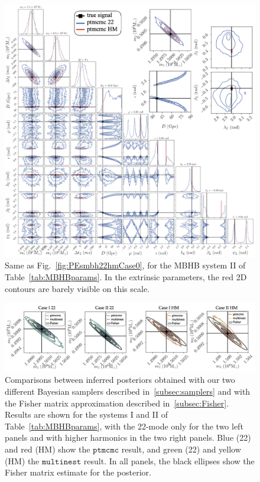 \documentclass[aps,showpacs,twocolumn,prd,superscriptaddress,nofootinbib]{revtex4-1}
\begin{document}
\begin{figure}
  \centering
  \includegraphics[width=.98\linewidth]{corner_smbh_case9_ptmcmc_22_hm_withzoom.png}
  \caption{Same as Fig.~\ref{fig:PEsmbh22hmCase0}, for the MBHB system II of Table~\ref{tab:MBHBparams}.
           In the extrinsic parameters, the red 2D contours are barely visible on this scale.}
  \label{fig:PEsmbh22hmCase9}
\end{figure}

\begin{figure}
  \centering
  \includegraphics[width=.98\linewidth]{row_m1m2_ptmcmc_bambi.png}
  \caption{Comparisons between inferred posteriors obtained with our two different Bayesian samplers described in~\ref{subsec:samplers} and with the Fisher matrix approximation described in~\ref{subsec:Fisher}. Results are shown for the systems I and II of Table~\ref{tab:MBHBparams}, with the 22-mode only for the two left panels and with higher harmonics in the two right panels. Blue (22) and red (HM) show the $\texttt{ptmcmc}$ result, and green (22) and yellow (HM) the $\texttt{multinest}$ result. In all panels, the black ellipses show the Fisher matrix estimate for the posterior.}
  \label{fig:PEsmbhm1m2ptmcmcbambi}
\end{figure}
\end{document}
